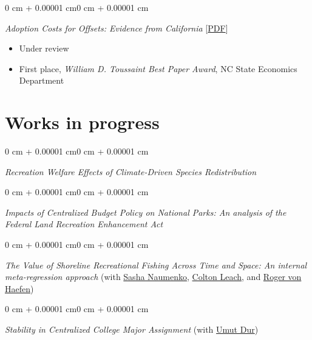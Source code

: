 \documentclass[12pt]{article}
\newenvironment{highlightsforbulletentries}{
	\begin{itemize}[
		topsep=0.10 cm,
		partopsep=0pt,
		leftmargin=20pt,
		]
	\setlength{\parsep}{0.10cm}\setlength{\itemsep}{-2pt}
	}{
	\end{itemize}
}
\newenvironment{onecolentry}{
	\begin{adjustwidth}{0 cm + 0.00001 cm}{0 cm + 0.00001 cm}
	}
	{
	\end{adjustwidth}
}
\newenvironment{paper}{
	\begin{onecolentry}
	\begin{hangingpar}
}{
	\end{hangingpar}
	\end{onecolentry}
	\smallskip
}
\begin{document}
\begin{paper}
    \emph{Adoption Costs for Offsets: Evidence from California} \hfill [\href{https://cenrep.ncsu.edu/publications/transaction-costs-of-emissions-offsets-evidence-from-california/}{PDF}]
    \begin{highlightsforbulletentries}
        \item Under review
        \item First place, \emph{William D. Toussaint Best Paper Award}, NC State Economics Department
    \end{highlightsforbulletentries}
\end{paper}

\section{Works in progress}

\begin{paper}
    \emph{Recreation Welfare Effects of Climate-Driven Species Redistribution}
\end{paper}

\begin{paper}
    \emph{Impacts of Centralized Budget Policy on National Parks: An analysis of the Federal Land Recreation Enhancement Act}
\end{paper}

\begin{paper}
    \emph{The Value of Shoreline Recreational Fishing Across Time and Space: An internal meta-regression approach} (with \href{https://www.linkedin.com/in/avn-econ}{Sasha Naumenko}, \href{https://www.linkedin.com/in/colton-leach-54a080136}{Colton Leach}, and \href{https://rvhaefen.wordpress.ncsu.edu/}{Roger von Haefen})
\end{paper}

\begin{paper}
    \emph{Stability in Centralized College Major Assignment} (with \href{https://sites.google.com/site/umutdur/}{Umut Dur})
\end{paper}

\end{document}
